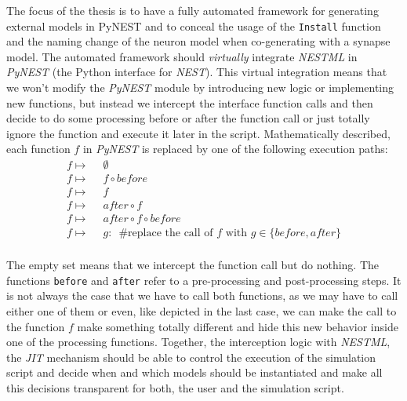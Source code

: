 The focus of the thesis is to have a fully automated framework for generating external models in PyNEST and to conceal the usage of the \texttt{Install} function and the naming change of the neuron model when co-generating with a synapse model. The automated framework should \emph{virtually} integrate \emph{NESTML} in \emph{PyNEST} (the Python interface for \emph{NEST}). This virtual integration means that we won't modify the \emph{PyNEST} module by introducing new logic or implementing new functions, but instead we intercept the interface function calls and then decide to do some processing before or after the function call or just totally ignore the function and execute it later in the script. Mathematically described, each function $f$ in \emph{PyNEST} is replaced by one of the following execution paths:
\begin{align*}
    f \mapsto & \enspace\emptyset                                                                         \\
    f \mapsto & \enspace f \circ before                                                                   \\
    f \mapsto & \enspace f                                                                                \\
    f \mapsto & \enspace after \circ f                                                                    \\
    f \mapsto & \enspace after \circ f \circ before                                                       \\
    f \mapsto & \enspace g:\enspace \text{\#replace the call of } f \text{ with } g \in \{before, after\} \\
\end{align*}

The empty set means that we intercept the function call but do nothing. The functions \texttt{before} and \texttt{after} refer to a pre-processing and post-processing steps. It is not always the case that we have to call both functions, as we may have to call either one of them or even, like depicted in the last case, we can make the call to the function $f$ make something totally different and hide this new behavior inside one of  the processing functions. Together, the interception logic with \emph{NESTML}, the \emph{JIT} mechanism should be able to control the execution of the simulation script and decide when and which models should be instantiated and make all this decisions transparent for both, the user and the simulation script.

